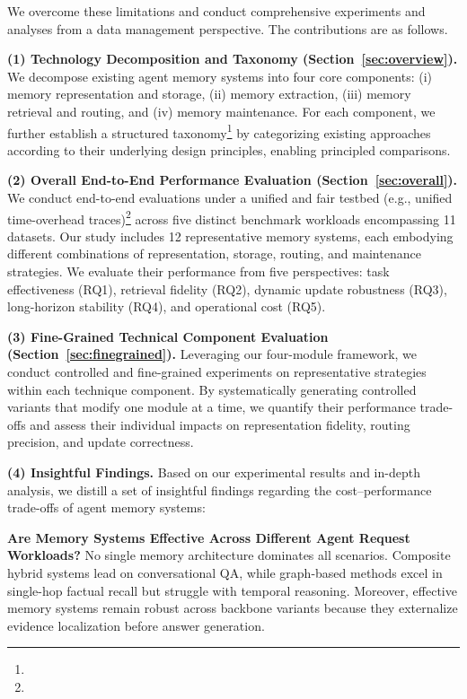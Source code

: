 We overcome these limitations and conduct comprehensive experiments and analyses from a data management perspective. The contributions are as follows.

\noindent
\textbf{(1) Technology Decomposition and Taxonomy (Section~\ref{sec:overview}).}
We decompose existing agent memory systems into four core components: (i) memory representation and storage, (ii) memory extraction, (iii) memory retrieval and routing, and (iv) memory maintenance. For each component, we further establish a structured taxonomy\footnote{} by categorizing existing approaches according to their underlying design principles, enabling principled comparisons.

\noindent
\textbf{(2) Overall End-to-End Performance Evaluation (Section~\ref{sec:overall}).}
We conduct end-to-end evaluations under a unified and fair testbed (e.g., {unified time-overhead traces})\footnote{} across five distinct benchmark workloads encompassing 11 datasets. Our study includes 12 representative memory systems, each embodying different combinations of representation, storage, routing, and maintenance strategies. We evaluate their performance from five perspectives: task effectiveness (RQ1), retrieval fidelity (RQ2), dynamic update robustness (RQ3), long-horizon stability (RQ4), and operational cost (RQ5).

\noindent
\textbf{(3) Fine-Grained Technical Component Evaluation (Section~\ref{sec:finegrained}).}
Leveraging our four-module framework, we conduct controlled and fine-grained experiments on representative strategies within each technique component. By systematically generating controlled variants that modify one module at a time, we quantify their performance trade-offs and assess their individual impacts on representation fidelity, routing precision, and update correctness.

\noindent
\textbf{(4) Insightful Findings.}
Based on our experimental results and in-depth analysis, we distill a set of insightful findings regarding the cost--performance trade-offs of agent memory systems:

\noindent
{} \textbf{Are Memory Systems Effective Across Different Agent Request Workloads?} No single memory architecture dominates all scenarios. Composite hybrid systems lead on conversational QA, while graph-based methods excel in single-hop factual recall but struggle with temporal reasoning. Moreover, effective memory systems remain robust across \llm backbone variants because they externalize evidence localization before answer generation.

